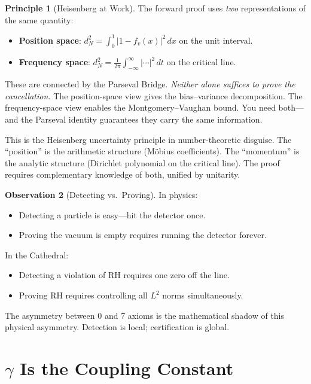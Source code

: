 \documentclass[11pt,a4paper]{article}
\theoremstyle{definition}
\newtheorem{observation}{Observation}[section]
\newtheorem{principle}[observation]{Principle}
\begin{document}
\begin{principle}[Heisenberg at Work]
The forward proof uses \emph{two} representations of the same
quantity:
\begin{itemize}
  \item \textbf{Position space}: $d_N^2 = \int_0^1 |1 - f_v(x)|^2\,dx$
    on the unit interval.
  \item \textbf{Frequency space}: $d_N^2 = \frac{1}{2\pi}
    \int_{-\infty}^{\infty} |\cdots|^2\,dt$ on the critical line.
\end{itemize}
These are connected by the Parseval Bridge. \emph{Neither alone
suffices to prove the cancellation.} The position-space view gives
the bias--variance decomposition. The frequency-space view enables
the Montgomery--Vaughan bound. You need both---and the Parseval
identity guarantees they carry the same information.

This is the Heisenberg uncertainty principle in number-theoretic
disguise. The ``position'' is the arithmetic structure (M\"obius
coefficients). The ``momentum'' is the analytic structure (Dirichlet
polynomial on the critical line). The proof requires complementary
knowledge of both, unified by unitarity.
\end{principle}

\begin{observation}[Detecting vs.\ Proving]
In physics:
\begin{itemize}
  \item Detecting a particle is easy---hit the detector once.
  \item Proving the vacuum is empty requires running the detector
    forever.
\end{itemize}
In the Cathedral:
\begin{itemize}
  \item Detecting a violation of RH requires one zero off the line.
  \item Proving RH requires controlling all $L^2$ norms simultaneously.
\end{itemize}
The asymmetry between 0 and 7 axioms is the mathematical shadow of
this physical asymmetry. Detection is local; certification is global.
\end{observation}

\section{$\gamma$ Is the Coupling Constant}
\label{sec:gamma}
\end{document}
